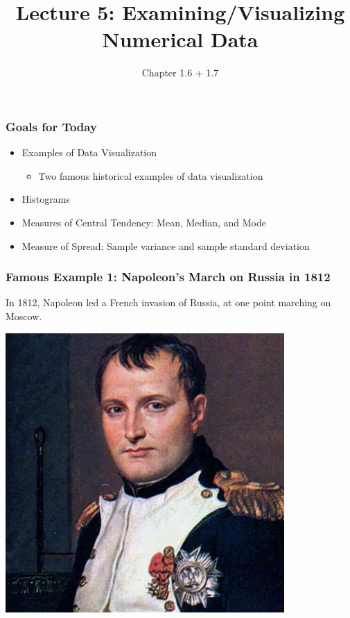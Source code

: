 \documentclass[handout]{beamer}
\title{Lecture 5: Examining/Visualizing Numerical Data}
\author{Chapter 1.6 + 1.7}
\date{}
\begin{document}
\begin{frame}
\titlepage
\end{frame}



\begin{frame}
\frametitle{Goals for Today}

\begin{itemize}
\item Examples of Data Visualization
\begin{itemize}
\item Two famous historical examples of data visualization
\end{itemize}
\item Histograms
\item Measures of Central Tendency: Mean, Median, and Mode
\item Measure of Spread:  Sample variance and sample standard deviation
\end{itemize}

\end{frame}


\begin{frame}
\frametitle{Famous Example 1:  Napoleon's March on Russia in 1812}

In 1812, Napoleon led a French invasion of Russia, at one point marching on Moscow.  
\begin{center}
\includegraphics[height=0.6\textheight]{figure/napoleon.jpg}
\end{center}

\end{frame}
\end{document}
